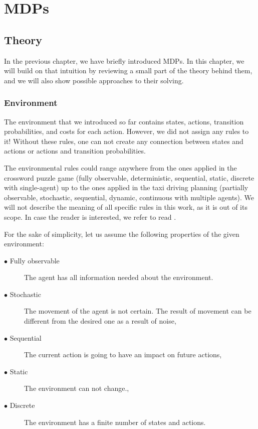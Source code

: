 

\part{MDPs}

\chapter{Theory}

In the previous chapter, we have briefly introduced MDPs. In this chapter, we will build on that intuition by reviewing a small part of the theory behind them, and we will also show possible approaches to their solving.

\section{Environment}
The environment that we introduced so far contains states, actions, transition probabilities, and costs for each action. However, we did not assign any rules to it! 
Without these rules, one can not create any connection between states and actions or actions and transition probabilities.

The environmental rules could range anywhere from the ones applied in the crossword puzzle game (fully observable, deterministic, sequential, static, discrete with single-agent) up to the ones applied in the taxi driving planning (partially observable, stochastic, sequential, dynamic, continuous with multiple agents). We will not describe the meaning of all specific rules in this work, as it is out of its scope. In case the reader is interested, we refer to read  \cite{russel2010}.

\newpage


For the sake of simplicity, let us assume the following properties of the given environment:
\begin{description}
  \item[$\bullet$ Fully observable] The agent has all information needed about the environment.
  \item[$\bullet$ Stochastic] The movement of the agent is not certain. The result of movement can be different from the desired one as a result of noise,
  \item[$\bullet$ Sequential] The current action is going to have an impact on future actions,
  \item[$\bullet$ Static] The environment can not change.,
  \item[$\bullet$ Discrete] The environment has a finite number of states and actions.
\end{description}




